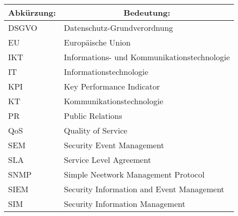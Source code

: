 \renewcommand{\arraystretch}{1.5}
\begin{center}
	\begin{tabular}{|l|l|}\hline
		\multicolumn{1}{|c|}{\textbf{Abkürzung:}} & \multicolumn{1}{c|}{\textbf{Bedeutung:}} \\ \hline
		DSGVO & Datenschutz-Grundverordnung \\ \hline
		EU & Europäische Union \\ \hline
		IKT & Informations- und Kommunikationstechnologie \\ \hline
		IT & Informationstechnologie \\ \hline
		KPI & Key Performance Indicator \\ \hline
		KT & Kommunikationstechnologie \\ \hline 
		PR & Public Relations \\ \hline
		QoS & Quality of Service \\ \hline
		SEM & Security Event Management \\ \hline
		SLA & Service Level Agreement \\ \hline
		SNMP & Simple Neetwork Management Protocol \\ \hline	
		SIEM & Security Information and Event Management \\ \hline
		SIM & Security Information Management \\ \hline		
	\end{tabular}
\end{center}
